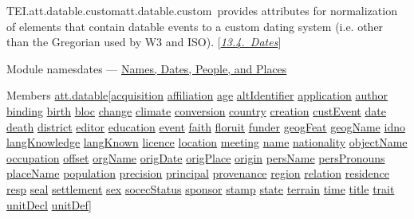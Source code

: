 \begin{reflist}
\item[]\begin{specHead}{TEI.att.datable.custom}{att.datable.custom} provides attributes for normalization of elements that contain datable events to a custom dating system (i.e. other than the Gregorian used by W3 and ISO). [\textit{\hyperref[NDDATE]{13.4.\ Dates}}]\end{specHead} 
    \item[{Module}]
  namesdates — \hyperref[ND]{Names, Dates, People, and Places}
    \item[{Members}]
  \hyperref[TEI.att.datable]{att.datable}[\hyperref[TEI.acquisition]{acquisition} \hyperref[TEI.affiliation]{affiliation} \hyperref[TEI.age]{age} \hyperref[TEI.altIdentifier]{altIdentifier} \hyperref[TEI.application]{application} \hyperref[TEI.author]{author} \hyperref[TEI.binding]{binding} \hyperref[TEI.birth]{birth} \hyperref[TEI.bloc]{bloc} \hyperref[TEI.change]{change} \hyperref[TEI.climate]{climate} \hyperref[TEI.conversion]{conversion} \hyperref[TEI.country]{country} \hyperref[TEI.creation]{creation} \hyperref[TEI.custEvent]{custEvent} \hyperref[TEI.date]{date} \hyperref[TEI.death]{death} \hyperref[TEI.district]{district} \hyperref[TEI.editor]{editor} \hyperref[TEI.education]{education} \hyperref[TEI.event]{event} \hyperref[TEI.faith]{faith} \hyperref[TEI.floruit]{floruit} \hyperref[TEI.funder]{funder} \hyperref[TEI.geogFeat]{geogFeat} \hyperref[TEI.geogName]{geogName} \hyperref[TEI.idno]{idno} \hyperref[TEI.langKnowledge]{langKnowledge} \hyperref[TEI.langKnown]{langKnown} \hyperref[TEI.licence]{licence} \hyperref[TEI.location]{location} \hyperref[TEI.meeting]{meeting} \hyperref[TEI.name]{name} \hyperref[TEI.nationality]{nationality} \hyperref[TEI.objectName]{objectName} \hyperref[TEI.occupation]{occupation} \hyperref[TEI.offset]{offset} \hyperref[TEI.orgName]{orgName} \hyperref[TEI.origDate]{origDate} \hyperref[TEI.origPlace]{origPlace} \hyperref[TEI.origin]{origin} \hyperref[TEI.persName]{persName} \hyperref[TEI.persPronouns]{persPronouns} \hyperref[TEI.placeName]{placeName} \hyperref[TEI.population]{population} \hyperref[TEI.precision]{precision} \hyperref[TEI.principal]{principal} \hyperref[TEI.provenance]{provenance} \hyperref[TEI.region]{region} \hyperref[TEI.relation]{relation} \hyperref[TEI.residence]{residence} \hyperref[TEI.resp]{resp} \hyperref[TEI.seal]{seal} \hyperref[TEI.settlement]{settlement} \hyperref[TEI.sex]{sex} \hyperref[TEI.socecStatus]{socecStatus} \hyperref[TEI.sponsor]{sponsor} \hyperref[TEI.stamp]{stamp} \hyperref[TEI.state]{state} \hyperref[TEI.terrain]{terrain} \hyperref[TEI.time]{time} \hyperref[TEI.title]{title} \hyperref[TEI.trait]{trait} \hyperref[TEI.unitDecl]{unitDecl} \hyperref[TEI.unitDef]{unitDef}]

\end{reflist}
